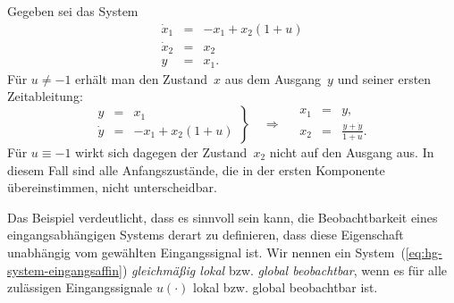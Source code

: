 \begin{example}
\label{exa:Minisystem-nicht-glm-beob}Gegeben sei das System
\begin{equation}
\begin{array}{lcl}
\dot{x}_{1} & = & -x_{1}+x_{2}(1+u)\\
\dot{x}_{2} & = & x_{2}\\
y & = & x_{1}.
\end{array}\label{eq:Minisystem-nicht-glm-beob}
\end{equation}
Für $u\neq-1$ erhält man den Zustand~$x$ aus dem Ausgang~$y$
und seiner ersten Zeitableitung:
\[
\left.\begin{array}{lcl}
y & = & x_{1}\\
\dot{y} & = & -x_{1}+x_{2}(1+u)
\end{array}\right\} \quad\Longrightarrow\quad\begin{array}{lcl}
x_{1} & = & y,\\
x_{2} & = & \frac{y+\dot{y}}{1+u}.
\end{array}
\]
Für $u\equiv-1$ wirkt sich dagegen der Zustand~$x_{2}$ nicht auf
den Ausgang aus. In diesem Fall sind alle Anfangszustände, die in
der ersten Komponente übereinstimmen, nicht unterscheidbar.
\end{example}

Das Beispiel verdeutlicht, dass es sinnvoll sein kann, die Beobachtbarkeit
eines eingangsabhängigen Systems derart zu definieren, dass diese
Eigenschaft unabhängig vom gewählten Eingangssignal ist. Wir nennen
ein System~(\ref{eq:hg-system-eingangsaffin}) \emph{gleichmäßig
lokal} bzw. \emph{global beobachtbar}, wenn es für alle zulässigen
Eingangssignale $u(\cdot)$ lokal bzw. global beobachtbar ist. 

